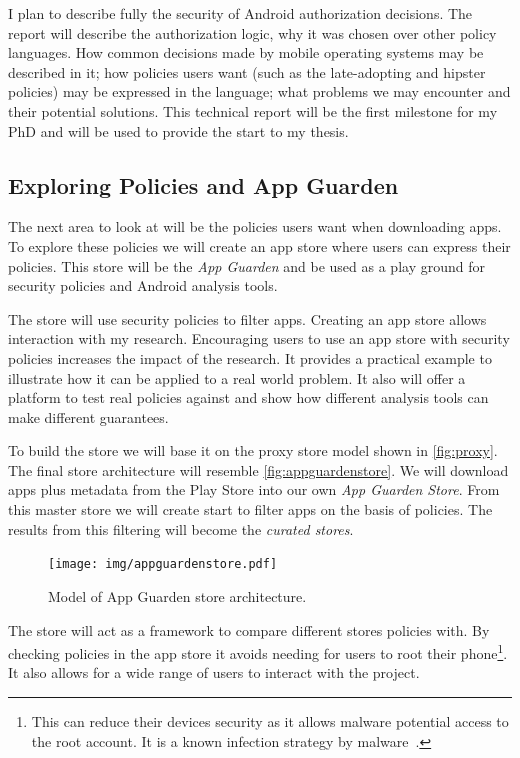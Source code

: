 \documentclass[a4paper,sfsidenotes]{%
  article%
}
\begin{document}
I plan to describe fully the security of Android authorization decisions. The
report will describe the authorization logic, why it was chosen over other
policy languages.  How common decisions made by mobile operating systems may be
described in it; how policies users want (such as the late-adopting and hipster
policies) may be expressed in the language; what problems we may encounter and
their potential solutions.  This technical report will be the first milestone
for my PhD and will be used to provide the start to my thesis.


\subsection{Exploring Policies and App Guarden}
\label{sec:appguarden}

The next area to look at will be the policies users want when downloading apps.
To explore these policies we will create an app store where users can express
their policies.  This store will be the \emph{App Guarden} and be used as a play
ground for security policies and Android analysis tools.

The store will use security policies to filter apps.  Creating an app store
allows interaction with my research.  Encouraging users to use an app store with
security policies increases the impact of the research. It provides a practical
example to illustrate how it can be applied to a real world problem.  It also
will offer a platform to test real policies against and show how different
analysis tools can make different guarantees.  

To build the store we will base it on the proxy store model shown in
\autoref{fig:proxy}.  The final store architecture will resemble
\autoref{fig:appguardenstore}.  We will download apps plus metadata from the Play Store
into our own \emph{App Guarden Store}.  From this master store we will create
start to filter apps on the basis of policies.  The results from this filtering
will become the \emph{curated stores}. 

\begin{figure}
  \centering
  \texttt{[image: img/appguardenstore.pdf]}
  \caption{Model of App Guarden store architecture.}
  \label{fig:appguardenstore}
\end{figure}

The store will act as a framework to compare different stores
policies with.  By checking policies in the app store it avoids
needing for users to root their phone\footnote{This can reduce their
devices security as it allows malware potential access to the root account.  It
is a known infection strategy by malware~\cite{Svajcer:2012wy}.}.
It also allows for a wide range of users to interact with the project. 
\end{document}
